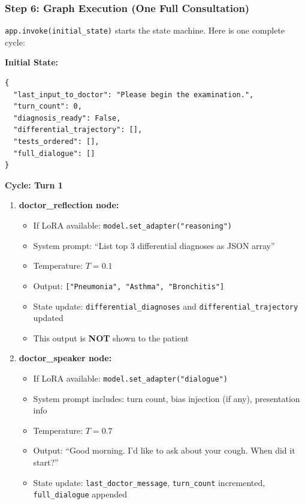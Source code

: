 \subsubsection{Step 6: Graph Execution (One Full Consultation)}

\begin{acadbox}[\textcolor{white}{What Happens}]
\texttt{app.invoke(initial\_state)} starts the state machine. Here is one complete cycle:

\textbf{Initial State:}
\begin{verbatim}
{
  "last_input_to_doctor": "Please begin the examination.",
  "turn_count": 0,
  "diagnosis_ready": False,
  "differential_trajectory": [],
  "tests_ordered": [],
  "full_dialogue": []
}
\end{verbatim}

\textbf{Cycle: Turn 1}
\begin{enumerate}
    \item \textbf{doctor\_reflection node:}
    \begin{itemize}
        \item If LoRA available: \texttt{model.set\_adapter("reasoning")}
        \item System prompt: ``List top 3 differential diagnoses as JSON array''
        \item Temperature: $T = 0.1$
        \item Output: \texttt{["Pneumonia", "Asthma", "Bronchitis"]}
        \item State update: \texttt{differential\_diagnoses} and \texttt{differential\_trajectory} updated
        \item This output is \textbf{NOT} shown to the patient
    \end{itemize}
    
    \item \textbf{doctor\_speaker node:}
    \begin{itemize}
        \item If LoRA available: \texttt{model.set\_adapter("dialogue")}
        \item System prompt includes: turn count, bias injection (if any), presentation info
        \item Temperature: $T = 0.7$
        \item Output: ``Good morning. I'd like to ask about your cough. When did it start?''
        \item State update: \texttt{last\_doctor\_message}, \texttt{turn\_count} incremented, \texttt{full\_dialogue} appended
    \end{itemize}
    

\end{enumerate}
\end{acadbox}
